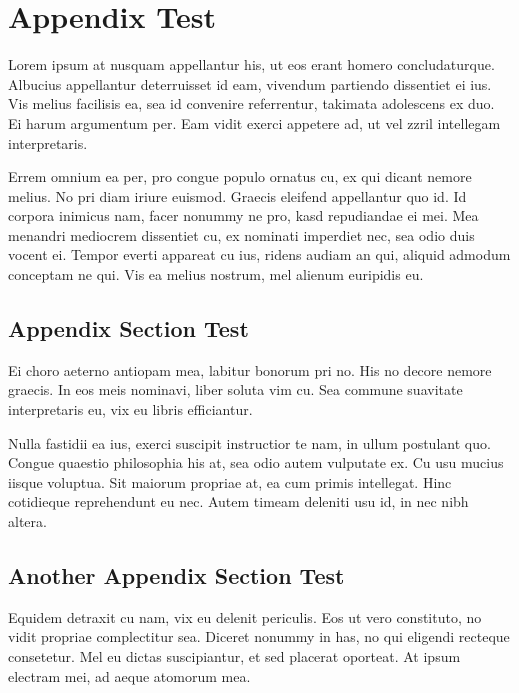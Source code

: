 \chapter{Appendix Test}
Lorem ipsum at nusquam appellantur his, ut eos erant homero
concludaturque. Albucius appellantur deterruisset id eam, vivendum
partiendo dissentiet ei ius. Vis melius facilisis ea, sea id convenire
referrentur, takimata adolescens ex duo. Ei harum argumentum per. Eam
vidit exerci appetere ad, ut vel zzril intellegam interpretaris.

Errem omnium ea per, pro congue populo ornatus cu, ex qui dicant
nemore melius. No pri diam iriure euismod. Graecis eleifend
appellantur quo id. Id corpora inimicus nam, facer nonummy ne pro,
kasd repudiandae ei mei. Mea menandri mediocrem dissentiet cu, ex
nominati imperdiet nec, sea odio duis vocent ei. Tempor everti
appareat cu ius, ridens audiam an qui, aliquid admodum conceptam ne
qui. Vis ea melius nostrum, mel alienum euripidis eu.

\section{Appendix Section Test}
Ei choro aeterno antiopam mea, labitur bonorum pri no. His no decore
nemore graecis. In eos meis nominavi, liber soluta vim cu. Sea commune
suavitate interpretaris eu, vix eu libris efficiantur.

Nulla fastidii ea ius, exerci suscipit instructior te nam, in ullum
postulant quo. Congue quaestio philosophia his at, sea odio autem
vulputate ex. Cu usu mucius iisque voluptua. Sit maiorum propriae at,
ea cum primis intellegat. Hinc cotidieque reprehendunt eu nec. Autem
timeam deleniti usu id, in nec nibh altera.

\section{Another Appendix Section Test}
Equidem detraxit cu nam, vix eu delenit periculis. Eos ut vero
constituto, no vidit propriae complectitur sea. Diceret nonummy in
has, no qui eligendi recteque consetetur. Mel eu dictas suscipiantur,
et sed placerat oporteat. At ipsum electram mei, ad aeque atomorum
mea.

